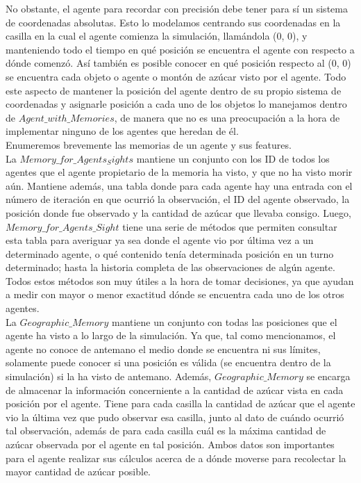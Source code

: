 \documentclass[11pt]{article}
\begin{document}
No obstante, el agente para recordar con precisión debe tener para sí un sistema de coordenadas absolutas. Esto lo modelamos centrando sus coordenadas en la casilla en la cual el agente comienza la simulación, llamándola (0, 0), y manteniendo todo el tiempo en qué posición se encuentra el agente con respecto a dónde comenzó. Así también es posible conocer en qué posición respecto al (0, 0) se encuentra cada objeto o agente o montón de azúcar visto por el agente. Todo este aspecto de mantener la posición del agente dentro de su propio sistema de coordenadas y asignarle posición a cada uno de los objetos lo manejamos dentro de $Agent\_with\_Memories$, de manera que no es una preocupación a la hora de implementar ninguno de los agentes que heredan de él.\\
Enumeremos brevemente las memorias de un agente y sus features.\\
La $Memory\_for\_Agents_Sights$ mantiene un conjunto con los ID de todos los agentes que el agente propietario de la memoria ha visto, y que no ha visto morir aún. Mantiene además, una tabla donde para cada agente hay una entrada con el número de iteración en que ocurrió la observación, el ID del agente observado, la posición donde fue observado y la cantidad de azúcar que llevaba consigo. Luego, $Memory\_for\_Agents\_Sight$ tiene una serie de métodos que permiten consultar esta tabla para averiguar ya sea donde el agente vio por última vez a un determinado agente, o qué contenido tenía determinada posición en un turno determinado; hasta la historia completa de las observaciones de algún agente. Todos estos métodos son muy útiles a la hora de tomar decisiones, ya que ayudan a medir con mayor o menor exactitud dónde se encuentra cada uno de los otros agentes.\\
La $Geographic\_Memory$ mantiene un conjunto con todas las posiciones que el agente ha visto a lo largo de la simulación. Ya que, tal como mencionamos, el agente no conoce de antemano el medio donde se encuentra ni sus límites, solamente puede conocer si una posición es válida (se encuentra dentro de la simulación) si la ha visto de antemano. Además, $Geographic\_Memory$ se encarga de almacenar la información concerniente a la cantidad de azúcar vista en cada posición por el agente. Tiene para cada casilla la cantidad de azúcar que el agente vio la última vez que pudo observar esa casilla, junto al dato de cuándo ocurrió tal observación, además de para cada casilla cuál es la máxima cantidad de azúcar observada por el agente en tal posición. Ambos datos son importantes para el agente realizar sus cálculos acerca de a dónde moverse para recolectar la mayor cantidad de azúcar posible.\\
\end{document}

